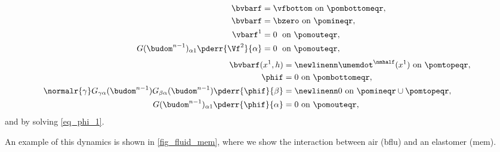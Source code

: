 \begin{itemize}
{        \begin{align}
            \label{bc_fl_membrane_1_current_disc}
            \bvbarf                                         & =  \vfbottom  \text{ on } \pombottomeqr, \\
            \label{bc_fl_membrane_2_current_disc}
            \bvbarf                                         & =  \bzero  \text{ on } \pomineqr,        \\
            \label{bc_fl_membrane_3_current_disc}
            \vbarf^1                                        & =  0 \; \text{ on } \pomouteqr ,         \\
            \label{bc_fl_membrane_4_current_disc}
            G(\budom^{n-1})_{\alpha 1}\pderr{\Vf^2}{\alpha} & =  0 \; \text{ on } \pomouteqr ,
        \end{align}
        \begin{align}
            \label{bc_fl_membrane_5_current_disc}
            \bvbarf(x^1, h)                                  & = \newlinenn
            \umemdot^\nmhalf(x^1)  \text{ on } \pomtopeqr,   &                                \\
            \label{bc_fl_membrane_6_current_disc}
            \phif                                            & = 0 \text{ on } \pombottomeqr, \\
            \label{bc_fl_membrane_7_current_disc}
            \normalr{\gamma}  G_{\gamma \alpha}(\budom^{n-1})  G_{\beta \alpha}(\budom^{n-1})
            \pderr{ \phif   }{\beta }                        & = \newlinenn
            0
            \text{ on } \pomineqr \cup \pomtopeqr ,          &                                \\
            G(\budom^{n-1})_{\alpha 1} \pderr{\phif}{\alpha} & = 0 \text{ on } \pomouteqr,
        \end{align}
        and by solving  \cref{eq_phi_1}.
    }
\end{itemize}


An example of this dynamics is shown in \cref{fig_fluid_mem}, where we show the interaction between air (\ac{bflu}) and an elastomer (\ac{mem}).

